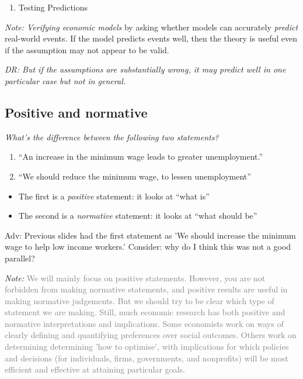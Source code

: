 \documentclass[]{article}
\providecommand{\tightlist}{%
  \setlength{\itemsep}{0pt}\setlength{\parskip}{0pt}}
\begin{document}
\begin{enumerate}
\def\labelenumi{\arabic{enumi}.}
\setcounter{enumi}{1}
\tightlist
\item
  Testing Predictions
\end{enumerate}

\emph{Note: Verifying economic models} by asking whether models can
accurately \emph{predict} real-world events. If the model predicts
events well, then the theory is useful even if the assumption may not
appear to be valid.

\emph{DR: But if the assumptions are substantially wrong, it may predict
well in one particular case but not in general.}

\hypertarget{positive-and-normative}{%
\subsection{Positive and normative}\label{positive-and-normative}}

\emph{What's the difference between the following two statements?}

\begin{enumerate}
\def\labelenumi{\arabic{enumi}.}
\item
  ``An increase in the minimum wage leads to greater unemployment.''
\item
  ``We should reduce the minimum wage, to lessen unemployment''
\end{enumerate}

\begin{itemize}
\item
  The first is a \emph{positive} statement: it looks at ``what is''
\item
  The second is a \emph{normative} statement: it looks at ``what should
  be''
\end{itemize}

\medskip

\textcolor{RawSienna}{Adv: Previous slides had the first statement as 'We should increase the minimum wage to help low income workers.'  Consider: why do I think this was not a good parallel?}

\medskip

\emph{Note:}
\textcolor{gray}{We will mainly focus on positive statements.  However, you are not forbidden from making normative statements, and positive results are useful in making normative judgements.  But we should try to be clear which type of statement we are making.  Still, much economic research has both positive and normative interpretations and implications.  Some economists work on ways of clearly defining and quantifying preferences over social outcomes.  Others work on determining determining 'how to optimise', with implications for which policies and decisions  (for individuals, firms, governments, and nonprofits) will be most efficient and effective at attaining particular goals.}
\end{document}
